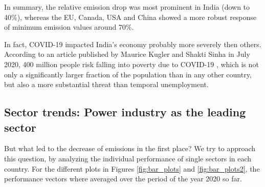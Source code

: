In summary, the relative emission drop was most prominent in India (down to 40\%), whereas the EU, Canada, USA and China showed a more robust response of minimum emission values around 70\%.

In fact, COVID-19 impacted India's economy probably more severely then others. According to an article published by Maurice Kugler and Shakti Sinha in July 2020, 400 million people risk falling into poverty due to COVID-19 \cite{Kugler}, which is not only a significantly larger fraction of the population than in any other country, but also a more substantial threat than temporal unemployment.

\subsection*{Sector trends: Power industry as the leading sector}%

But what led to the decrease of emissions in the first place? We try to approach this question, by analyzing the individual performance of single sectors in each country. For the different plots in Figures \ref{fig:bar_plots} and \ref{fig:bar_plots2}, the performance vectors where averaged over the period of the year 2020 so far.

